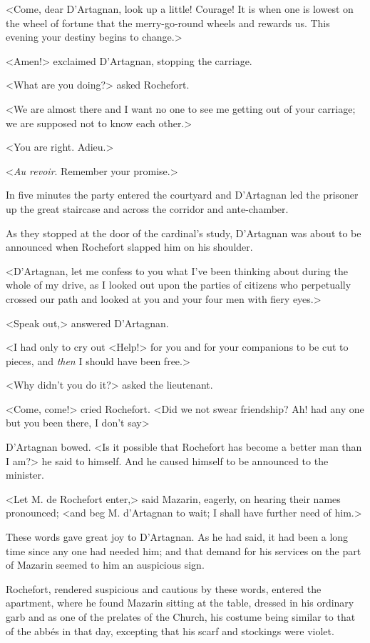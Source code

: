 <Come, dear D'Artagnan, look up a little! Courage! It is when one is lowest on the wheel of fortune that the merry-go-round wheels and rewards us. This evening your destiny begins to change.>

<Amen!> exclaimed D'Artagnan, stopping the carriage.

<What are you doing?> asked Rochefort.

<We are almost there and I want no one to see me getting out of your carriage; we are supposed not to know each other.>

<You are right. Adieu.>

<\textit{Au revoir}. Remember your promise.>

In five minutes the party entered the courtyard and D'Artagnan led the prisoner up the great staircase and across the corridor and ante-chamber.

As they stopped at the door of the cardinal's study, D'Artagnan was about to be announced when Rochefort slapped him on his shoulder.

<D'Artagnan, let me confess to you what I've been thinking about during the whole of my drive, as I looked out upon the parties of citizens who perpetually crossed our path and looked at you and your four men with fiery eyes.>

<Speak out,> answered D'Artagnan.

<I had only to cry out <Help!> for you and for your companions to be cut to pieces, and \textit{then} I should have been free.>

<Why didn't you do it?> asked the lieutenant.

<Come, come!> cried Rochefort. <Did we not swear friendship? Ah! had any one but you been there, I don't say\longdash>

D'Artagnan bowed. <Is it possible that Rochefort has become a better man than I am?> he said to himself. And he caused himself to be announced to the minister.

<Let M. de Rochefort enter,> said Mazarin, eagerly, on hearing their names pronounced; <and beg M. d'Artagnan to wait; I shall have further need of him.>

These words gave great joy to D'Artagnan. As he had said, it had been a long time since any one had needed him; and that demand for his services on the part of Mazarin seemed to him an auspicious sign.

Rochefort, rendered suspicious and cautious by these words, entered the apartment, where he found Mazarin sitting at the table, dressed in his ordinary garb and as one of the prelates of the Church, his costume being similar to that of the abbés in that day, excepting that his scarf and stockings were violet.

